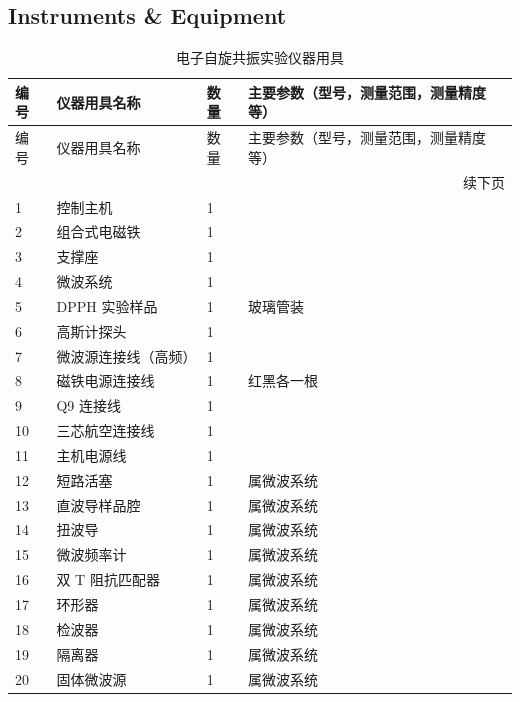 \subsection{Instruments \& Equipment}
\begin{longtable}[htbp]{p{}|p{}|p{}|p{}}
	\caption{电子自旋共振实验仪器用具} \label{tbl:电子自旋共振实验仪器用具} \\
	\hline
	编号 & 仪器用具名称 & 数量 & 主要参数（型号，测量范围，测量精度等） \\
	\hline
	\endfirsthead
	
	\hline
	编号 & 仪器用具名称 & 数量 & 主要参数（型号，测量范围，测量精度等） \\
	\hline
	\endhead
	
	\hline
	\multicolumn{4}{r}{续下页} \\
	\hline
	\endfoot
	
	\hline
	\endlastfoot
	
	1 & 控制主机 & 1 &  \\
	2 & 组合式电磁铁 & 1 &  \\
	3 & 支撑座 & 1 &  \\
	4 & 微波系统 & 1 &  \\
	5 & DPPH 实验样品 & 1 & 玻璃管装 \\
	6 & 高斯计探头 & 1 &  \\
	7 & 微波源连接线（高频） & 1 &  \\
	8 & 磁铁电源连接线 & 1 & 红黑各一根 \\
	9 & Q9 连接线 & 1 &  \\
	10 & 三芯航空连接线 & 1 &  \\
	11 & 主机电源线 & 1 &  \\
	12 & 短路活塞 & 1 & 属微波系统 \\
	13 & 直波导样品腔 & 1 & 属微波系统 \\
	14 & 扭波导 & 1 & 属微波系统 \\
	15 & 微波频率计 & 1 & 属微波系统 \\
	16 & 双 T 阻抗匹配器 & 1 & 属微波系统 \\
	17 & 环形器 & 1 & 属微波系统 \\
	18 & 检波器 & 1 & 属微波系统 \\
	19 & 隔离器 & 1 & 属微波系统 \\
	20 & 固体微波源 & 1 & 属微波系统 \\
	
\end{longtable}


